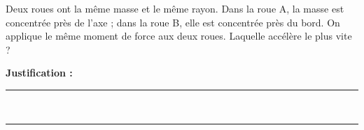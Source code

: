 Deux roues ont la même masse et le même rayon. Dans la roue A, la masse est concentrée près de l'axe ; dans la roue B, elle est concentrée près du bord. On applique le même moment de force aux deux roues. Laquelle accélère le plus vite ?

\choices

\noindent\textbf{Justification :} \hrulefill \\[2.5ex]
\rule{\linewidth}{0.4pt} \\[2.5ex]
\rule{\linewidth}{0.4pt}
\vfill
